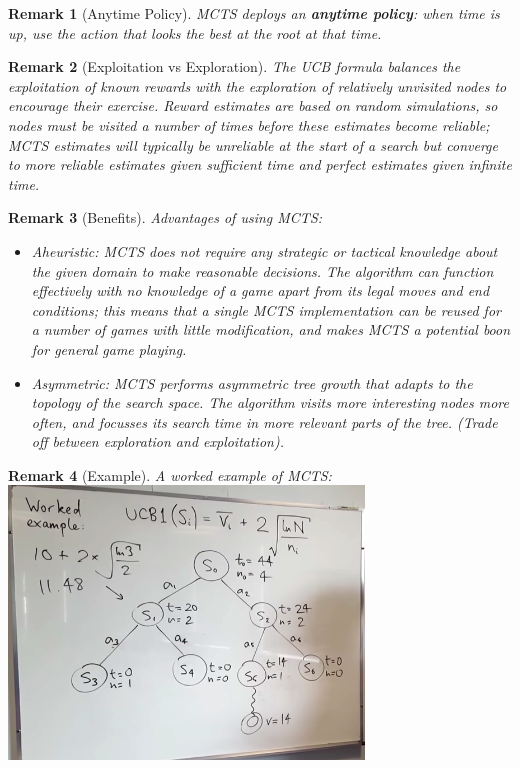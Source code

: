 \documentclass[12pt]{article}
\newtheorem*{remark}{Remark}
\begin{document}
\begin{remark}[Anytime Policy]
MCTS deploys an \textbf{anytime policy}: when time is up, use the action that looks the best at the root at that time.
\end{remark}

\begin{remark}[Exploitation vs Exploration]
The UCB formula balances the exploitation of known rewards with the exploration of relatively unvisited nodes to encourage their exercise. Reward estimates are based on random simulations, so nodes must be visited a number of times before these estimates become reliable; MCTS estimates will typically be unreliable at the start of a search but converge to more reliable estimates given sufficient time and perfect estimates given infinite time.
\end{remark}

\begin{remark}[Benefits] 
Advantages of using MCTS:
\begin{itemize}
\item \textsl{Aheuristic}: MCTS does not require any strategic or tactical knowledge about the given domain to make reasonable decisions. The algorithm can function effectively with no knowledge of a game apart from its legal moves and end conditions; this means that a single MCTS implementation can be reused for a number of games with little modification, and makes MCTS a potential boon for general game playing.

\item \textsl{Asymmetric}: MCTS performs asymmetric tree growth that adapts to the topology of the search space. The algorithm visits more interesting nodes more often, and focusses its search time in more relevant parts of the tree. (Trade off between exploration and exploitation).
\end{itemize}
\end{remark}

\begin{remark}[Example]
A worked example of MCTS:  \\
\includegraphics[scale=0.7]{UCBeg}

\end{remark}
\end{document}
